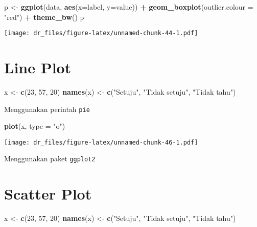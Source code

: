 \documentclass[
]{book}
\newenvironment{Shaded}{\begin{snugshade}}{\end{snugshade}}
\newcommand{\DataTypeTok}[1]{\textcolor[rgb]{0.13,0.29,0.53}{#1}}
\newcommand{\DecValTok}[1]{\textcolor[rgb]{0.00,0.00,0.81}{#1}}
\newcommand{\KeywordTok}[1]{\textcolor[rgb]{0.13,0.29,0.53}{\textbf{#1}}}
\newcommand{\NormalTok}[1]{#1}
\newcommand{\OperatorTok}[1]{\textcolor[rgb]{0.81,0.36,0.00}{\textbf{#1}}}
\newcommand{\StringTok}[1]{\textcolor[rgb]{0.31,0.60,0.02}{#1}}
\begin{document}
\begin{Shaded}
\begin{Highlighting}[]
\NormalTok{p <-}\StringTok{ }\KeywordTok{ggplot}\NormalTok{(data, }\KeywordTok{aes}\NormalTok{(}\DataTypeTok{x=}\NormalTok{label, }\DataTypeTok{y=}\NormalTok{value)) }\OperatorTok{+}
\StringTok{  }\KeywordTok{geom_boxplot}\NormalTok{(}\DataTypeTok{outlier.colour =} \StringTok{"red"}\NormalTok{) }\OperatorTok{+}
\StringTok{  }\KeywordTok{theme_bw}\NormalTok{()}
\NormalTok{p}
\end{Highlighting}
\end{Shaded}

\texttt{[image: dr\_files/figure-latex/unnamed-chunk-44-1.pdf]}

\hypertarget{line-plot}{%
\section{Line Plot}\label{line-plot}}

\begin{Shaded}
\begin{Highlighting}[]
\NormalTok{x <-}\StringTok{ }\KeywordTok{c}\NormalTok{(}\DecValTok{23}\NormalTok{, }\DecValTok{57}\NormalTok{, }\DecValTok{20}\NormalTok{)}
\KeywordTok{names}\NormalTok{(x) <-}\StringTok{ }\KeywordTok{c}\NormalTok{(}\StringTok{"Setuju"}\NormalTok{, }\StringTok{"Tidak setuju"}\NormalTok{, }\StringTok{"Tidak tahu"}\NormalTok{)}
\end{Highlighting}
\end{Shaded}

Menggunakan perintah \texttt{pie}

\begin{Shaded}
\begin{Highlighting}[]
\KeywordTok{plot}\NormalTok{(x, }\DataTypeTok{type =} \StringTok{"o"}\NormalTok{)}
\end{Highlighting}
\end{Shaded}

\texttt{[image: dr\_files/figure-latex/unnamed-chunk-46-1.pdf]}

Menggunakan paket \texttt{ggplot2}

\hypertarget{scatter-plot}{%
\section{Scatter Plot}\label{scatter-plot}}

\begin{Shaded}
\begin{Highlighting}[]
\NormalTok{x <-}\StringTok{ }\KeywordTok{c}\NormalTok{(}\DecValTok{23}\NormalTok{, }\DecValTok{57}\NormalTok{, }\DecValTok{20}\NormalTok{)}
\KeywordTok{names}\NormalTok{(x) <-}\StringTok{ }\KeywordTok{c}\NormalTok{(}\StringTok{"Setuju"}\NormalTok{, }\StringTok{"Tidak setuju"}\NormalTok{, }\StringTok{"Tidak tahu"}\NormalTok{)}
\end{Highlighting}
\end{Shaded}
\end{document}
